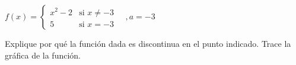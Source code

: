 \setcounter{enumi}{18}
\item $f(x) = \begin{cases} x^2 - 2 & \text{si } x \neq -3 \\ 5 & \text{si } x = -3 \end{cases} \quad , a = -3$
\par
Explique por qué la función dada es discontinua en el punto indicado. Trace la gráfica de la función.

